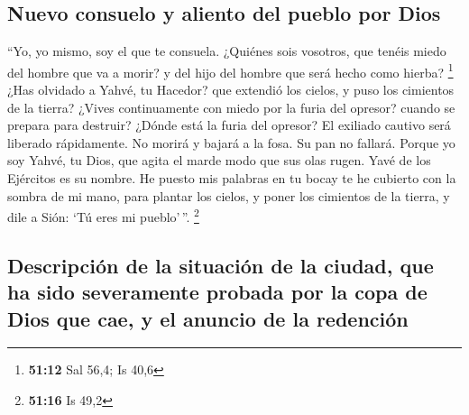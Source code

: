 \hypertarget{nuevo-consuelo-y-aliento-del-pueblo-por-dios}{%
\subsection{Nuevo consuelo y aliento del pueblo por
Dios}\label{nuevo-consuelo-y-aliento-del-pueblo-por-dios}}

 ``Yo, yo mismo, soy el que te consuela. ¿Quiénes sois
vosotros, que tenéis miedo del hombre que va a morir? y del hijo del
hombre que será hecho como hierba? \footnote{\textbf{51:12} Sal 56,4; Is
  40,6}  ¿Has olvidado a Yahvé, tu Hacedor? que extendió
los cielos, y puso los cimientos de la tierra? ¿Vives continuamente con
miedo por la furia del opresor? cuando se prepara para destruir? ¿Dónde
está la furia del opresor?  El exiliado cautivo será
liberado rápidamente. No morirá y bajará a la fosa. Su pan no fallará.
 Porque yo soy Yahvé, tu Dios, que agita el marde modo
que sus olas rugen. Yavé de los Ejércitos es su nombre. 
He puesto mis palabras en tu bocay te he cubierto con la sombra de mi
mano, para plantar los cielos, y poner los cimientos de la tierra, y
dile a Sión: `Tú eres mi pueblo'\,''. \footnote{\textbf{51:16} Is 49,2}

\hypertarget{descripciuxf3n-de-la-situaciuxf3n-de-la-ciudad-que-ha-sido-severamente-probada-por-la-copa-de-dios-que-cae-y-el-anuncio-de-la-redenciuxf3n}{%
\subsection{Descripción de la situación de la ciudad, que ha sido
severamente probada por la copa de Dios que cae, y el anuncio de la
redención}\label{descripciuxf3n-de-la-situaciuxf3n-de-la-ciudad-que-ha-sido-severamente-probada-por-la-copa-de-dios-que-cae-y-el-anuncio-de-la-redenciuxf3n}}

